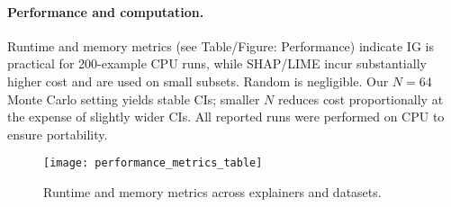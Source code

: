 \paragraph{Performance and computation.} Runtime and memory metrics (see Table/Figure: Performance) indicate IG is practical for 200-example CPU runs, while SHAP/LIME incur substantially higher cost and are used on small subsets. Random is negligible. Our $N{=}64$ Monte Carlo setting yields stable CIs; smaller $N$ reduces cost proportionally at the expense of slightly wider CIs. All reported runs were performed on CPU to ensure portability.

\begin{figure}[t]
    \centering
    \texttt{[image: performance\_metrics\_table]}
    \caption{Runtime and memory metrics across explainers and datasets.}
\end{figure}

